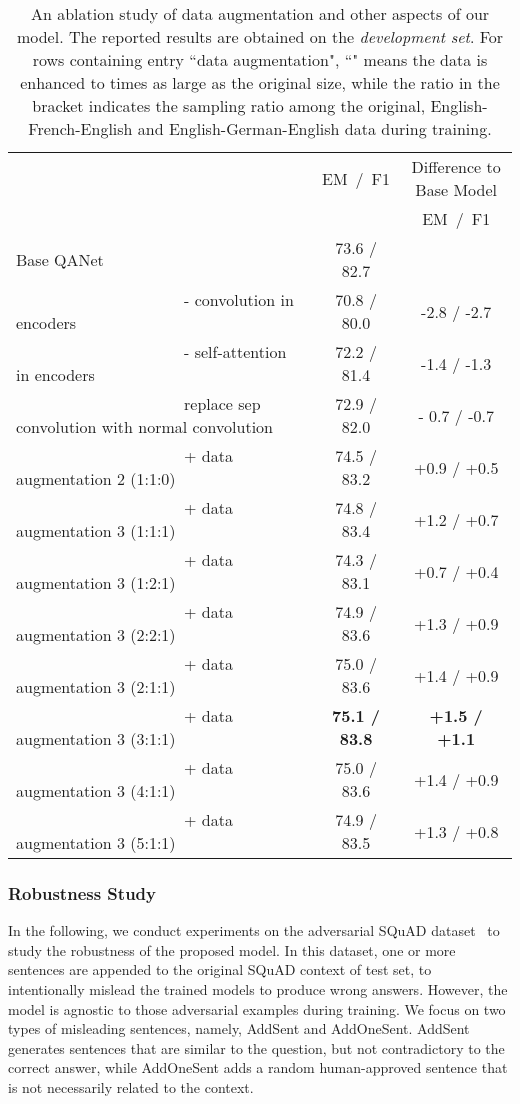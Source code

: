 \documentclass{article} \usepackage{iclr2018_conference,times}
\begin{document}
\begin{table}[h!]
\small
\begin{center}
\begin{tabular}{lcc}
\hline & EM~/~F1  & Difference to Base Model\\
      &         &  EM~/~F1 \\
\hline
Base QANet &  73.6 / 82.7 \\\hline 
~~~~~~~~~~~~~~~~~~~~~- convolution in encoders & 70.8 / 80.0 & -2.8 / -2.7 \\
~~~~~~~~~~~~~~~~~~~~~- self-attention in encoders  & 72.2 / 81.4 & -1.4 / -1.3\\
~~~~~~~~~~~~~~~~~~~~~replace sep convolution with normal convolution  & 72.9 / 82.0 &  - 0.7 / -0.7\\\hline
~~~~~~~~~~~~~~~~~~~~~+ data augmentation 2 (1:1:0) &  74.5 / 83.2 & +0.9 / +0.5 \\ 
~~~~~~~~~~~~~~~~~~~~~+ data augmentation 3 (1:1:1) &  74.8 / 83.4 & +1.2 / +0.7 \\ 
~~~~~~~~~~~~~~~~~~~~~+ data augmentation 3 (1:2:1) &  74.3 / 83.1 & +0.7 / +0.4 \\ 
~~~~~~~~~~~~~~~~~~~~~+ data augmentation 3 (2:2:1) &  74.9 / 83.6 & +1.3 / +0.9 \\ 
~~~~~~~~~~~~~~~~~~~~~+ data augmentation 3 (2:1:1) &  75.0 / 83.6 & +1.4 / +0.9 \\ 
~~~~~~~~~~~~~~~~~~~~~+ data augmentation 3 (3:1:1) &  \textbf{75.1 / 83.8} & \textbf{+1.5 / +1.1}\\ 
~~~~~~~~~~~~~~~~~~~~~+ data augmentation 3 (4:1:1) &  75.0 / 83.6 & +1.4 / +0.9\\ 
~~~~~~~~~~~~~~~~~~~~~+ data augmentation 3 (5:1:1) &  74.9 / 83.5 & +1.3 / +0.8\\ 
 \hline \end{tabular}
\end{center}
\caption{An ablation study of data augmentation and other aspects of our model. The reported results are obtained on the \emph{development set}. For rows containing entry ``data augmentation",
``" means the data is enhanced to  times as large as the original size, while
the ratio in the bracket indicates the sampling ratio among the original, English-French-English and English-German-English data during training.}
\label{table:squad_ablation}
\end{table}


\subsubsection{Robustness Study}
In the following, we conduct experiments on the adversarial SQuAD dataset~\citep{JiaL17} to study the robustness of the proposed model. 
In this dataset, one or more sentences are appended to the original SQuAD context of test set, to intentionally mislead the trained models to produce wrong answers. However, the model is agnostic to those adversarial examples during training.
We focus on two types of misleading sentences, namely, AddSent and AddOneSent. AddSent generates
sentences that are similar to the question, but
not contradictory to the correct answer, while AddOneSent adds
a random human-approved sentence that is not necessarily related to the context.
\end{document}
